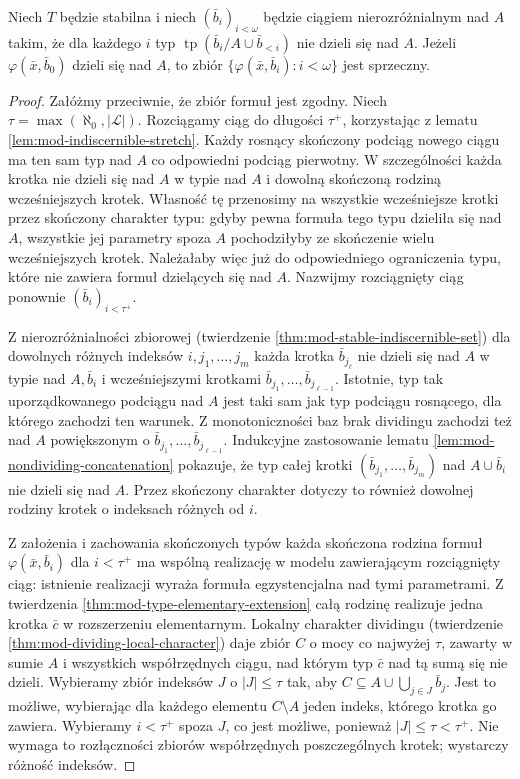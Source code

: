\begin{twierdzenie}
\label{thm:mod-kim-lemma-stable}
Niech $T$ będzie stabilna i niech
$(\bar b_i)_{i<\omega}$ będzie ciągiem
nierozróżnialnym nad $A$ takim, że dla
każdego $i$ typ
$\operatorname{tp}(\bar b_i/A\cup\bar b_{<i})$
nie dzieli się nad $A$.
Jeżeli $\varphi(\bar x,\bar b_0)$
dzieli się nad $A$, to zbiór
$\{\varphi(\bar x,\bar b_i):i<\omega\}$
jest sprzeczny.
\end{twierdzenie}
\begin{proof}
Załóżmy przeciwnie, że zbiór formuł jest
zgodny. Niech $\tau=\max(\aleph_0,|\mathcal L|)$.
Rozciągamy ciąg do długości $\tau^+$,
korzystając z lematu
\ref{lem:mod-indiscernible-stretch}.
Każdy rosnący skończony podciąg nowego
ciągu ma ten sam typ nad $A$ co odpowiedni
podciąg pierwotny. W szczególności
każda krotka nie dzieli się nad $A$
w typie nad $A$ i dowolną skończoną
rodziną wcześniejszych krotek.
Własność tę przenosimy na wszystkie
wcześniejsze krotki przez skończony
charakter typu: gdyby pewna formuła tego
typu dzieliła się nad $A$, wszystkie jej
parametry spoza $A$ pochodziłyby ze skończenie
wielu wcześniejszych krotek. Należałaby więc
już do odpowiedniego ograniczenia typu,
które nie zawiera formuł dzielących się nad $A$.
Nazwijmy rozciągnięty ciąg ponownie
$(\bar b_i)_{i<\tau^+}$.

Z nierozróżnialności zbiorowej
(twierdzenie \ref{thm:mod-stable-indiscernible-set})
dla dowolnych różnych indeksów
$i,j_1,\ldots,j_m$ każda krotka
$\bar b_{j_\ell}$ nie dzieli się nad $A$
w typie nad $A,\bar b_i$ i wcześniejszymi
krotkami $\bar b_{j_1},\ldots,\bar b_{j_{\ell-1}}$.
Istotnie, typ tak uporządkowanego podciągu
nad $A$ jest taki sam jak typ podciągu
rosnącego, dla którego zachodzi ten warunek.
Z monotoniczności baz brak dividingu
zachodzi też nad $A$ powiększonym
o $\bar b_{j_1},\ldots,\bar b_{j_{\ell-1}}$.
Indukcyjne zastosowanie lematu
\ref{lem:mod-nondividing-concatenation}
pokazuje, że typ całej krotki
$(\bar b_{j_1},\ldots,\bar b_{j_m})$
nad $A\cup\bar b_i$ nie dzieli się nad $A$.
Przez skończony charakter dotyczy to
również dowolnej rodziny krotek o indeksach
różnych od $i$.

Z założenia i zachowania skończonych
typów każda skończona rodzina formuł
$\varphi(\bar x,\bar b_i)$ dla $i<\tau^+$
ma wspólną realizację w modelu zawierającym
rozciągnięty ciąg: istnienie realizacji wyraża
formuła egzystencjalna nad tymi parametrami.
Z twierdzenia \ref{thm:mod-type-elementary-extension}
całą rodzinę realizuje jedna krotka $\bar c$
w rozszerzeniu elementarnym.
Lokalny charakter dividingu
(twierdzenie \ref{thm:mod-dividing-local-character})
daje zbiór $C$ o mocy co najwyżej $\tau$,
zawarty w sumie $A$ i wszystkich współrzędnych
ciągu, nad którym typ $\bar c$ nad tą sumą
się nie dzieli.
Wybieramy zbiór indeksów $J$ o $|J|\leq\tau$
tak, aby $C\subseteq A\cup\bigcup_{j\in J}\bar b_j$.
Jest to możliwe, wybierając dla każdego
elementu $C\setminus A$ jeden indeks,
którego krotka go zawiera.
Wybieramy $i<\tau^+$ spoza $J$, co jest możliwe,
ponieważ $|J|\leq\tau<\tau^+$.
Nie wymaga to rozłączności zbiorów współrzędnych
poszczególnych krotek; wystarczy różność indeksów.


\end{proof}
